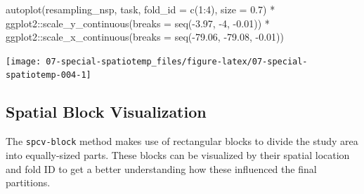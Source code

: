\documentclass[
]{scrbook}
\newenvironment{Shaded}{\begin{snugshade}}{\end{snugshade}}
\newcommand{\AttributeTok}[1]{\textcolor[rgb]{0.77,0.63,0.00}{#1}}
\newcommand{\ConstantTok}[1]{\textcolor[rgb]{0.00,0.00,0.00}{#1}}
\newcommand{\DecValTok}[1]{\textcolor[rgb]{0.00,0.00,0.81}{#1}}
\newcommand{\DocumentationTok}[1]{\textcolor[rgb]{0.56,0.35,0.01}{\textbf{\textit{#1}}}}
\newcommand{\FloatTok}[1]{\textcolor[rgb]{0.00,0.00,0.81}{#1}}
\newcommand{\FunctionTok}[1]{\textcolor[rgb]{0.00,0.00,0.00}{#1}}
\newcommand{\NormalTok}[1]{#1}
\newcommand{\OtherTok}[1]{\textcolor[rgb]{0.56,0.35,0.01}{#1}}
\newcommand{\SpecialCharTok}[1]{\textcolor[rgb]{0.00,0.00,0.00}{#1}}
\newcommand{\StringTok}[1]{\textcolor[rgb]{0.31,0.60,0.02}{#1}}
\renewenvironment{Shaded} {\begin{snugshade}\small} {\end{snugshade}}
\begin{document}
\begin{Shaded}
\begin{Highlighting}[]
\FunctionTok{autoplot}\NormalTok{(resampling\_nsp, task, }\AttributeTok{fold\_id =} \FunctionTok{c}\NormalTok{(}\DecValTok{1}\SpecialCharTok{:}\DecValTok{4}\NormalTok{), }\AttributeTok{size =} \FloatTok{0.7}\NormalTok{) }\SpecialCharTok{*}
\NormalTok{  ggplot2}\SpecialCharTok{::}\FunctionTok{scale\_y\_continuous}\NormalTok{(}\AttributeTok{breaks =} \FunctionTok{seq}\NormalTok{(}\SpecialCharTok{{-}}\FloatTok{3.97}\NormalTok{, }\SpecialCharTok{{-}}\DecValTok{4}\NormalTok{, }\SpecialCharTok{{-}}\FloatTok{0.01}\NormalTok{)) }\SpecialCharTok{*}
\NormalTok{  ggplot2}\SpecialCharTok{::}\FunctionTok{scale\_x\_continuous}\NormalTok{(}\AttributeTok{breaks =} \FunctionTok{seq}\NormalTok{(}\SpecialCharTok{{-}}\FloatTok{79.06}\NormalTok{, }\SpecialCharTok{{-}}\FloatTok{79.08}\NormalTok{, }\SpecialCharTok{{-}}\FloatTok{0.01}\NormalTok{))}
\end{Highlighting}
\end{Shaded}

\begin{center}\texttt{[image: 07-special-spatiotemp\_files/figure-latex/07-special-spatiotemp-004-1]} \end{center}

\hypertarget{vis-spatial-block}{%
\subsection{Spatial Block Visualization}\label{vis-spatial-block}}

The \texttt{spcv-block} method makes use of rectangular blocks to divide the study area into equally-sized parts.
These blocks can be visualized by their spatial location and fold ID to get a better understanding how these influenced the final partitions.

\begin{Shaded}
\end{Shaded}
\end{document}
